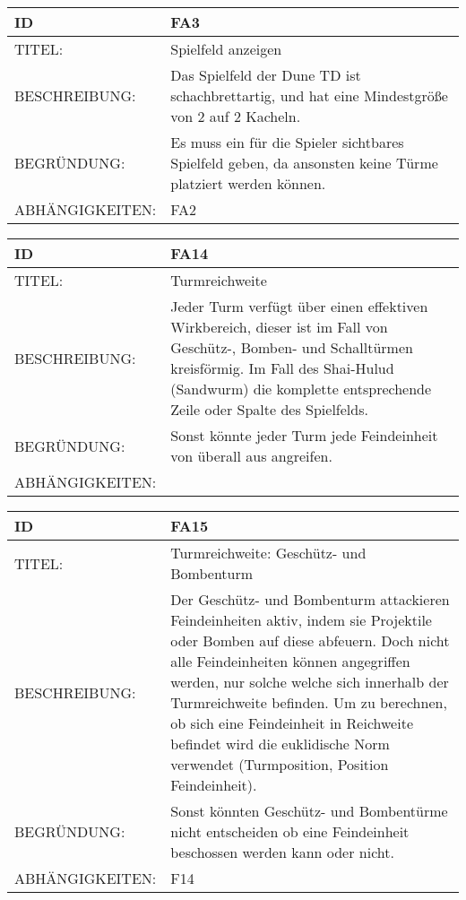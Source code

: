 \documentclass{uulm-assignment}
\begin{document}
\begin{tabularx}{16cm}{l|X}
\textbf{ID} & \textbf{FA3} \\
\hline
TITEL: & Spielfeld anzeigen \\
\hline
BESCHREIBUNG: & Das Spielfeld der Dune TD ist schachbrettartig, und hat eine Mindestgröße von 2 auf 2 Kacheln.
\\
\hline
BEGRÜNDUNG: & Es muss ein für die Spieler sichtbares Spielfeld geben, da ansonsten keine Türme
platziert werden können. \\
\hline
ABHÄNGIGKEITEN: & FA2\\
\end{tabularx}

\begin{tabularx}{16cm}{l|X}
	\textbf{ID} & \textbf{FA14} \\
	\hline
	TITEL: & Turmreichweite \\
	\hline
	BESCHREIBUNG: & Jeder Turm verfügt über einen effektiven Wirkbereich, dieser ist im Fall von \mbox{Geschütz-,} Bomben- und Schalltürmen kreisförmig.
	Im Fall des Shai-Hulud (Sandwurm) die komplette entsprechende Zeile oder Spalte des Spielfelds.\\
	\hline
	BEGRÜNDUNG: & Sonst könnte jeder Turm jede Feindeinheit von überall aus angreifen. \\
	\hline
	ABHÄNGIGKEITEN: & \\
\end{tabularx}

\begin{tabularx}{16cm}{l|X}
	\textbf{ID} & \textbf{FA15} \\
	\hline
	TITEL: & Turmreichweite: Geschütz- und Bombenturm \\
	\hline
	BESCHREIBUNG: & Der Geschütz- und Bombenturm attackieren Feindeinheiten aktiv, indem sie Projektile oder Bomben auf diese abfeuern.
	Doch nicht alle Feindeinheiten können angegriffen werden, nur solche welche sich innerhalb der Turmreichweite befinden.
	Um zu berechnen, ob sich eine Feindeinheit in Reichweite befindet wird die euklidische Norm verwendet (Turmposition, Position Feindeinheit).\\
	\hline
	BEGRÜNDUNG: & Sonst könnten Geschütz- und Bombentürme nicht entscheiden ob eine Feindeinheit beschossen werden kann oder nicht.\\
	\hline
	ABHÄNGIGKEITEN: & F14\\
\end{tabularx}
\end{document}
